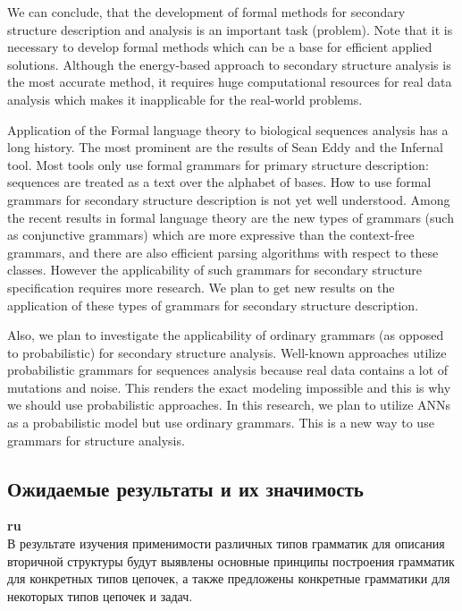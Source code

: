 \documentclass[12pt]{article}  %
\theoremstyle{remark}
\begin{document}
We can conclude, that the development of formal methods for secondary structure description and analysis is an important task (problem).
Note that it is necessary to develop formal methods which can be a base for efficient applied solutions.
Although the energy-based approach to secondary structure analysis is the most accurate method, it requires huge computational resources for real data analysis which makes it inapplicable for the real-world problems.

Application of the Formal language theory to biological sequences analysis has a long history. The most prominent are the results of Sean Eddy and the Infernal tool. Most tools only use formal grammars for primary structure description: sequences are treated as a text over the alphabet of bases. 
How to use formal grammars for secondary structure description is not yet well understood.
Among the recent results in formal language theory are the new types of grammars (such as conjunctive grammars) which are more expressive than the context-free grammars, and there are also efficient parsing algorithms with respect to these classes.
However the applicability of such grammars for secondary structure specification requires more research.
We plan to get new results on the application of these types of grammars for secondary structure description.

Also, we plan to investigate the applicability of ordinary grammars (as opposed to probabilistic) for secondary structure analysis.
Well-known approaches utilize probabilistic grammars for sequences analysis because real data contains a lot of mutations and noise. This renders the exact modeling impossible and this is why we should use probabilistic approaches.
In this research, we plan to utilize ANNs as a probabilistic model but use ordinary grammars. This is a new way to use grammars for structure analysis.

\subsection{Ожидаемые результаты и их значимость}

\textbf{ru}\\
В результате изучения применимости различных типов грамматик для описания вторичной структуры будут выявлены основные принципы построения грамматик для конкретных типов цепочек, а также предложены конкретные грамматики для некоторых типов цепочек и задач.
\end{document}
